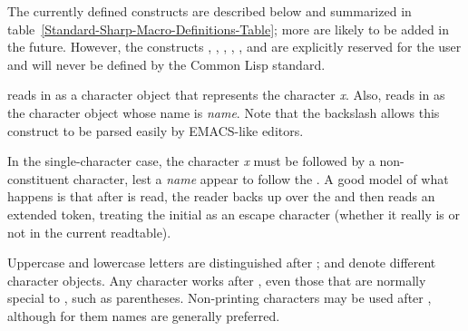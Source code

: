 The currently defined \cd{\#} constructs are described below
and summarized in table~\ref{Standard-Sharp-Macro-Definitions-Table};
more are likely to be added in the future.  However, the constructs
\cd{\#!}, , \cd{\#{\Xlbracket}}, \cd{\#{\Xrbracket}},
\cd{\#{\Xlbrace}}, and \cd{\#{\Xrbrace}}
are explicitly reserved for the user and will never be defined by the
Common Lisp standard.
\begin{flushdesc}
\item[\cd{\#{\Xbackslash}}]
 reads in as a character object that represents the
character \emph{x}.  Also,  reads in as the character object
whose name is \emph{name}.
Note that the backslash \cd{{\Xbackslash}} allows this
construct to be parsed easily by {EMACS}-like editors.

In the single-character case, the character \emph{x} must be followed
by a non-constituent character, lest a \emph{name} appear to follow the
\cd{\#{\Xbackslash}}.  A good model of what happens is that after \cd{\#{\Xbackslash}} is read,
the reader backs up over the \cd{{\Xbackslash}} and then reads an extended token,
treating the initial \cd{{\Xbackslash}} as an escape character (whether it really
is or not in the current readtable).

Uppercase and lowercase letters are distinguished after \cd{\#{\Xbackslash}};
 and  denote different character objects.  Any
character works after \cd{\#{\Xbackslash}}, even those that are normally special to
, such as parentheses.  Non-printing characters may be used
after \cd{\#{\Xbackslash}}, although for them names are generally preferred.


\end{flushdesc}
